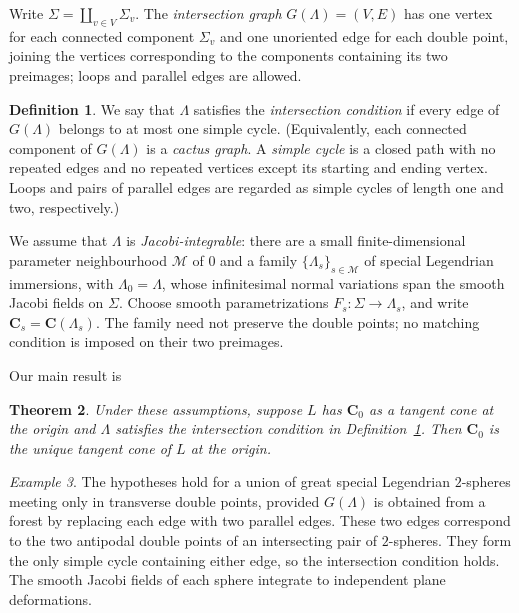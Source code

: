 \documentclass[11pt,a4paper]{article}
\numberwithin{equation}{section}
\newtheorem{theorem}{Theorem}[section]
\theoremstyle{definition}
\newtheorem{definition}[theorem]{Definition}
\theoremstyle{remark}
\newtheorem{example}[theorem]{Example}
\begin{document}
	Write $\Sigma=\coprod_{v\in V}\Sigma_v$. The \emph{intersection graph}
	$G(\Lambda)=(V,E)$ has one vertex for each connected component $\Sigma_v$
	and one unoriented edge for each double point, joining the vertices
	corresponding to the components containing its two preimages; loops and
	parallel edges are allowed.
	
	\begin{definition}\label{def:graph-condition}
		We say that $\Lambda$ satisfies the \emph{intersection condition} if every edge
		of $G(\Lambda)$ belongs to at most one simple cycle.
		(Equivalently, each connected component of $G(\Lambda)$ is a \emph{cactus graph}.
		A \emph{simple cycle} is a closed path with no repeated edges and no repeated
		vertices except its starting and ending vertex.
		Loops and pairs of parallel edges are regarded as simple cycles of length one
		and two, respectively.)
	\end{definition}
	
	We assume that $\Lambda$ is \emph{Jacobi-integrable}:
	there are a small finite-dimensional parameter neighbourhood $\mathcal M$
	of $0$ and a family $\{\Lambda_s\}_{s\in\mathcal M}$ of special
	Legendrian immersions, with $\Lambda_0=\Lambda$, whose infinitesimal normal
	variations span the smooth Jacobi fields on $\Sigma$. Choose smooth
	parametrizations $F_s:\Sigma\to\Lambda_s$, and write
	$\mathbf C_s=\mathbf C(\Lambda_s)$. The family need not preserve the
	double points; no matching condition is imposed on their two preimages.
	
	Our main result is
	\begin{theorem}\label{thm:target}
		Under these assumptions, suppose $L$ has $\mathbf C_0$ as a tangent cone
		at the origin and $\Lambda$ satisfies the intersection condition in
		Definition~\ref{def:graph-condition}. Then $\mathbf C_0$ is the unique tangent
		cone of $L$ at the origin.
	\end{theorem}
	
	\begin{example}\label{ex:tree}
		The hypotheses hold for a union of great special Legendrian $2$-spheres
		meeting only in transverse double points, provided $G(\Lambda)$ is
		obtained from a forest by replacing each edge with two parallel edges.
		These two edges correspond to the two antipodal double points of an
		intersecting pair of $2$-spheres. They form the only simple cycle
		containing either edge, so the intersection condition holds.
		The smooth Jacobi fields of each sphere integrate to independent plane
		deformations.
	\end{example}
	
\end{document}
